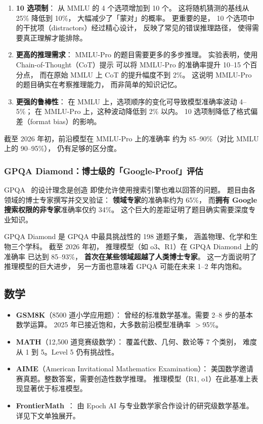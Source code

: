 \begin{enumerate}[noitemsep]
  \item \textbf{10 选项制}：
        从 MMLU 的 4 个选项增加到 10 个。
        这将随机猜测的基线从 25\% 降低到 10\%，
        大幅减少了「蒙对」的概率。
        更重要的是，
        10 个选项中的干扰项（distractors）经过精心设计，
        反映了常见的错误推理路径，
        使得需要真正理解才能排除。
  \item \textbf{更高的推理需求}：
        MMLU-Pro 的题目需要更多的多步推理。
        实验表明，使用 Chain-of-Thought（CoT）提示
        可以将 MMLU-Pro 的准确率提升 10--15 个百分点，
        而在原始 MMLU 上 CoT 的提升幅度不到 2\%。
        这说明 MMLU-Pro 的题目确实在考察推理能力，
        而非简单的知识记忆。
  \item \textbf{更强的鲁棒性}：
        在 MMLU 上，选项顺序的变化可导致模型准确率波动 4--5\%；
        在 MMLU-Pro 上，这种波动降低到 2\% 以内。
        10 选项制降低了格式偏差（format bias）的影响。
\end{enumerate}

截至 2026 年初，前沿模型在 MMLU-Pro 上的准确率
约为 85--90\%（对比 MMLU 上的 90--95\%），
仍有足够的区分度。

\subsubsection{GPQA Diamond：博士级的「Google-Proof」评估}

GPQA~\cite{rein2024gpqa} 的设计理念是创造
即使允许使用搜索引擎也难以回答的问题。
题目由各领域的博士专家撰写并交叉验证：
\textbf{领域专家}的准确率约为 65\%，
而\textbf{拥有 Google 搜索权限的非专家}准确率仅约 34\%。
这个巨大的差距证明了题目确实需要深度专业知识。

GPQA Diamond 是 GPQA 中最具挑战性的 198 道题子集，
涵盖物理、化学和生物三个学科。
截至 2026 年初，
推理模型（如 o3、R1）在 GPQA Diamond 上的准确率
已达到 85--93\%，
\textbf{首次在某些领域超越了人类博士专家}。
这一方面说明了推理模型的巨大进步，
另一方面也意味着 GPQA 可能在未来 1--2 年内饱和。

\subsection{数学}
\begin{itemize}[noitemsep]
  \item \textbf{GSM8K}（8500 道小学应用题）：
        曾经的标准数学基准。需要 2--8 步的基本数学运算。
        2025 年已接近饱和，大多数前沿模型准确率 $>$95\%。
  \item \textbf{MATH}（12,500 道竞赛级数学）：
        覆盖代数、几何、数论等 7 个类别，
        难度从 1 到 5。Level 5 仍有挑战性。
  \item \textbf{AIME}（American Invitational Mathematics Examination）：
        美国数学邀请赛真题。整数答案，需要创造性数学推理。
        推理模型（R1, o1）在此基准上表现显著优于标准模型。
  \item \textbf{FrontierMath}~\cite{glazer2024frontiermath}：
        由 Epoch AI 与专业数学家合作设计的研究级数学基准。
        详见下文单独展开。
\end{itemize}

